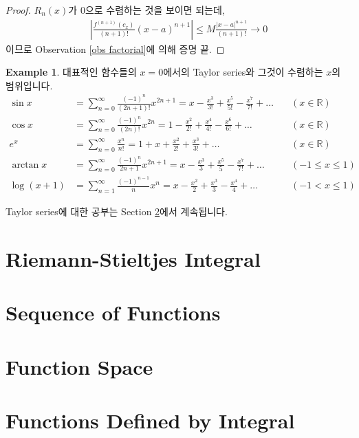 \documentclass[12pt]{article}
\theoremstyle{definition}
\newtheorem*{ex}{Example}
\def\RR{\mathbb{R}}
\newcommand{\abs}[1]{\left\vert#1\right\vert}
\begin{document}
\begin{proof}
	\(R_n(x)\)가 0으로 수렴하는 것을 보이면 되는데,
	\begin{gather*}
		\abs{\frac{f^{(n+1)}(c_x)}{(n+1)!} (x-a)^{n+1}} \le M\frac{\abs{x-a}^{n+1}}{(n+1)!} \longrightarrow 0
	\end{gather*}
	이므로 Observation \ref{obs factorial}에 의해 증명 끝.
\end{proof}

\begin{ex}
	대표적인 함수들의 \(x=0\)에서의 Taylor series와 그것이 수렴하는 \(x\)의 범위입니다.
	\begin{align*}
		\sin x &= \sum_{n=0}^\infty \frac{(-1)^n}{(2n+1)!} x^{2n+1} = x - \frac{x^3}{3!} + \frac{x^5}{5!} - \frac{x^7}{7!} + \ldots \quad &(x \in \RR)\\
		\cos x &= \sum_{n=0}^\infty \frac{(-1)^n}{(2n)!} x^{2n} = 1 - \frac{x^2}{2!} + \frac{x^4}{4!} - \frac{x^6}{6!} + \ldots \quad &(x \in \RR)\\
		e^x &= \sum_{n=0}^\infty \frac{x^n}{n!} = 1 + x + \frac{x^2}{2!} + \frac{x^3}{3!} + \ldots \quad &(x \in \RR)\\
		\arctan x &= \sum_{n=0}^\infty \frac{(-1)^n}{2n+1} x^{2n+1} = x - \frac{x^3}{3} + \frac{x^5}{5} - \frac{x^7}{7!} + \ldots \quad &(-1 \le x \le 1)\\
		\log (x+1) &= \sum_{n=1}^\infty \frac{(-1)^{n-1}}{n} x^n = x - \frac{x^2}{2} + \frac{x^3}{3} - \frac{x^4}{4} + \ldots \quad &(-1 < x \le 1)
	\end{align*}
\end{ex}

Taylor series에 대한 공부는 Section \ref{sec seq of ftn}에서 계속됩니다.

\newpage

\section{Riemann-Stieltjes Integral}

\section{Sequence of Functions} \label{sec seq of ftn}

\section{Function Space}

\section{Functions Defined by Integral}
\end{document}
